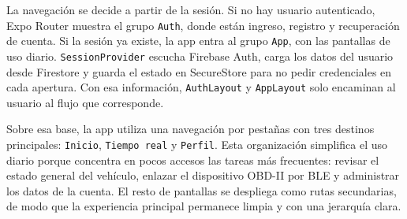 \documentclass[12pt,letterpaper]{report}
\begin{document}
La navegación se decide a partir de la sesión. Si no hay usuario autenticado, Expo Router muestra el grupo \texttt{Auth}, donde están ingreso, registro y recuperación de cuenta. Si la sesión ya existe, la app entra al grupo \texttt{App}, con las pantallas de uso diario. \texttt{SessionProvider} escucha Firebase Auth, carga los datos del usuario desde Firestore y guarda el estado en SecureStore para no pedir credenciales en cada apertura. Con esa información, \texttt{AuthLayout} y \texttt{AppLayout} solo encaminan al usuario al flujo que corresponde.

Sobre esa base, la app utiliza una navegación por pestañas con tres destinos principales: \texttt{Inicio}, \texttt{Tiempo real} y \texttt{Perfil}. Esta organización simplifica el uso diario porque concentra en pocos accesos las tareas más frecuentes: revisar el estado general del vehículo, enlazar el dispositivo OBD-II por BLE y administrar los datos de la cuenta. El resto de pantallas se despliega como rutas secundarias, de modo que la experiencia principal permanece limpia y con una jerarquía clara.
\end{document}
